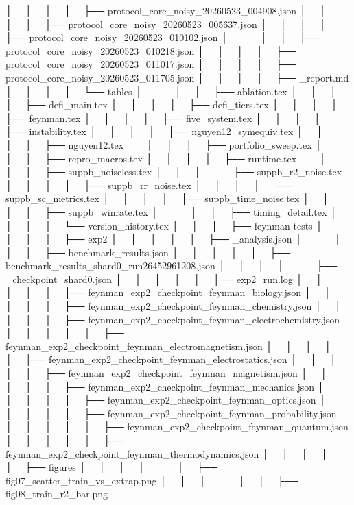 │   │       │   │   ├── protocol_core_noisy_20260523_004908.json
│   │       │   │   ├── protocol_core_noisy_20260523_005637.json
│   │       │   │   ├── protocol_core_noisy_20260523_010102.json
│   │       │   │   ├── protocol_core_noisy_20260523_010218.json
│   │       │   │   ├── protocol_core_noisy_20260523_011017.json
│   │       │   │   ├── protocol_core_noisy_20260523_011705.json
│   │       │   │   ├── _report.md
│   │       │   │   └── tables
│   │       │   │       ├── ablation.tex
│   │       │   │       ├── defi_main.tex
│   │       │   │       ├── defi_tiers.tex
│   │       │   │       ├── feynman.tex
│   │       │   │       ├── five_system.tex
│   │       │   │       ├── instability.tex
│   │       │   │       ├── nguyen12_symequiv.tex
│   │       │   │       ├── nguyen12.tex
│   │       │   │       ├── portfolio_sweep.tex
│   │       │   │       ├── repro_macros.tex
│   │       │   │       ├── runtime.tex
│   │       │   │       ├── suppb_noiseless.tex
│   │       │   │       ├── suppb_r2_noise.tex
│   │       │   │       ├── suppb_rr_noise.tex
│   │       │   │       ├── suppb_sc_metrics.tex
│   │       │   │       ├── suppb_time_noise.tex
│   │       │   │       ├── suppb_winrate.tex
│   │       │   │       ├── timing_detail.tex
│   │       │   │       └── version_history.tex
│   │       │   ├── feynman-tests
│   │       │   │   ├── exp2
│   │       │   │   │   ├── _analysis.json
│   │       │   │   │   ├── benchmark_results.json
│   │       │   │   │   ├── benchmark_results_shard0_run26452961208.json
│   │       │   │   │   ├── _checkpoint_shard0.json
│   │       │   │   │   ├── exp2_run.log
│   │       │   │   │   ├── feynman_exp2_checkpoint_feynman_biology.json
│   │       │   │   │   ├── feynman_exp2_checkpoint_feynman_chemistry.json
│   │       │   │   │   ├── feynman_exp2_checkpoint_feynman_electrochemistry.json
│   │       │   │   │   ├── feynman_exp2_checkpoint_feynman_electromagnetism.json
│   │       │   │   │   ├── feynman_exp2_checkpoint_feynman_electrostatics.json
│   │       │   │   │   ├── feynman_exp2_checkpoint_feynman_magnetism.json
│   │       │   │   │   ├── feynman_exp2_checkpoint_feynman_mechanics.json
│   │       │   │   │   ├── feynman_exp2_checkpoint_feynman_optics.json
│   │       │   │   │   ├── feynman_exp2_checkpoint_feynman_probability.json
│   │       │   │   │   ├── feynman_exp2_checkpoint_feynman_quantum.json
│   │       │   │   │   ├── feynman_exp2_checkpoint_feynman_thermodynamics.json
│   │       │   │   │   ├── figures
│   │       │   │   │   │   ├── fig07_scatter_train_vs_extrap.png
│   │       │   │   │   │   ├── fig08_train_r2_bar.png
